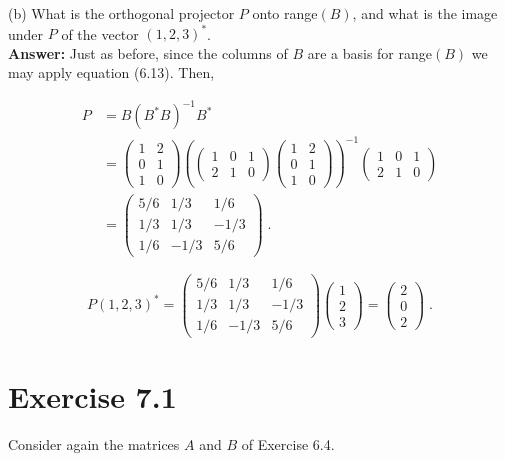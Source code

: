 \documentclass[11pt]{article}
\begin{document}
(b) What is the orthogonal projector $P$ onto range$(B)$, and what is the image under $P$ of the vector $(1,2,3)^*$. \\

\textbf{Answer:} Just as before, since the columns of $B$ are a basis for range$(B)$ we may apply equation (6.13). Then,

\begin{align*}
P &= B(B^*B)^{-1}B^* \\
&= \begin{pmatrix} 1 & 2 \\ 0 & 1 \\ 1 & 0 \end{pmatrix}
\left(\begin{pmatrix} 1&0&1 \\ 2&1&0 \end{pmatrix}
\begin{pmatrix} 1 & 2 \\ 0 & 1 \\ 1 & 0 \end{pmatrix}\right)^{-1}\begin{pmatrix} 1&0&1 \\ 2&1&0 \end{pmatrix} \\
&=\begin{pmatrix} 5/6 & 1/3 & 1/6 \\ 1/3 & 1/3 & -1/3 \\ 1/6 & -1/3 & 5/6\end{pmatrix} \;.
\end{align*}

$$P(1,2,3)^* = \begin{pmatrix} 5/6 & 1/3 & 1/6 \\ 1/3 & 1/3 & -1/3 \\ 1/6 & -1/3 & 5/6\end{pmatrix}
\begin{pmatrix}1 \\ 2 \\ 3 \end{pmatrix} = 
\begin{pmatrix}
2 \\ 0 \\ 2
\end{pmatrix} \;.$$

\section*{Exercise 7.1}
Consider again the matrices $A$ and $B$ of Exercise 6.4.\\
\end{document}
